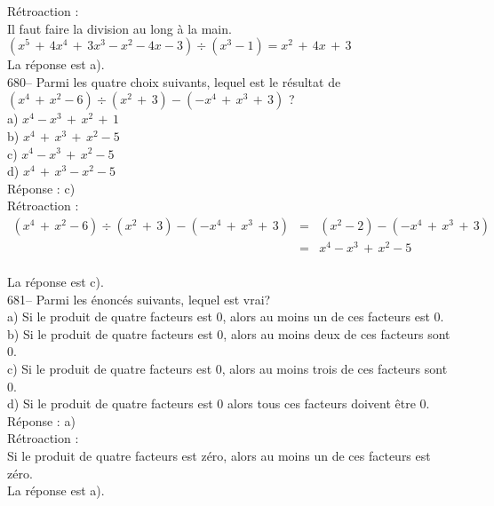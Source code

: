﻿\documentclass[letterpaper, 12pt]{article}
\begin{document}
R\'etroaction :\\
Il faut faire la division au long \`a la main.  \\
$\left( x^{5}\,+\,4x^{4}\,+\,3x^{3}-x^{2}-4x-3\right) \div\left(
x^{3}-1\right)=x^{2}\,+\,4x\,+\,3$\\
La r\'eponse est a).\\

680-- Parmi les quatre choix suivants, lequel est le r\'esultat de $\left(
x^{4}\,+\,x^{2}-6\right) \div\left( x^{2}\,+\,3\right) -\left(
-x^{4}\,+\,x^{3}\,+\,3\right)$ ?\\
a) $x^{4}-x^{3}\,+\,x^{2}\,+\,1$\\
b) $x^{4}\,+\,x^{3}\,+\,x^{2}-5$\\
c) $x^{4}-x^{3}\,+\,x^{2}-5$\\
d) $x^{4}\,+\,x^{3}-x^{2}-5$\\

R\'eponse : c)\\

R\'etroaction :\\
\begin{eqnarray*}
\left( x^{4}\,+\,x^{2}-6\right) \div\left( x^{2}\,+\,3\right) -\left(
-x^{4}\,+\,x^{3}\,+\,3\right)&=&\left( x^{2}-2\right)-\left(
-x^{4}\,+\,x^{3}\,+\,3\right)\\[1mm]
&=&x^{4}-x^{3}\,+\,x^{2}-5\\[1mm]
\end{eqnarray*}

La r\'eponse est c).\\

681-- Parmi les \'enonc\'es suivants, lequel est vrai?\\
a) Si le produit de quatre facteurs est 0, alors au moins un de ces facteurs
est 0.  \\
b) Si le produit de quatre facteurs est 0, alors au moins deux de ces
facteurs sont 0.  \\
c) Si le produit de quatre facteurs est 0, alors au moins trois de ces
facteurs sont 0.  \\
d) Si le produit de quatre facteurs est 0 alors tous ces facteurs doivent
\^etre 0.\\

R\'eponse : a)\\

R\'etroaction : \\
Si le produit de quatre facteurs est z\'ero, alors au moins un de ces
facteurs est z\'ero.  \\
La r\'eponse est a).\\
\end{document}
